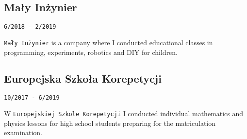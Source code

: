 \documentclass{article}
\begin{document}
\begin{minipage}[t]{.5\textwidth}
	\subsection{Mały Inżynier}
	\texttt{6/2018 - 2/2019}
	\par\texttt{Mały Inżynier} is a company where I conducted educational classes in programming, experiments, robotics and DIY for children.

	\subsection{Europejska Szkoła Korepetycji}
	\texttt{10/2017 - 6/2019}
	\par W \texttt{Europejskiej Szkole Korepetycji} I conducted individual mathematics and physics lessons for high school students preparing for the matriculation examination.

\end{minipage}\hfill
\end{document}
